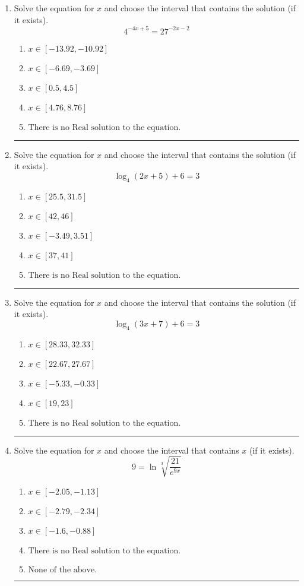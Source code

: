 \documentclass[14pt]{extbook}
\newcommand{\litem}[1]{\item#1\hspace*{-1cm}\rule{\textwidth}{0.4pt}}
\begin{document}
\begin{enumerate}
{\begin{enumerate}[label=\Alph*.]
\end{enumerate} }
\litem{
Solve the equation for $x$ and choose the interval that contains the solution (if it exists).\[ 4^{-4x+5} = 27^{-2x-2} \]\begin{enumerate}[label=\Alph*.]
\item \( x \in [-13.92, -10.92] \)
\item \( x \in [-6.69, -3.69] \)
\item \( x \in [0.5, 4.5] \)
\item \( x \in [4.76, 8.76] \)
\item \( \text{There is no Real solution to the equation.} \)

\end{enumerate} }
\litem{
Solve the equation for $x$ and choose the interval that contains the solution (if it exists).\[ \log_{4}{(2x+5)}+6 = 3 \]\begin{enumerate}[label=\Alph*.]
\item \( x \in [25.5, 31.5] \)
\item \( x \in [42, 46] \)
\item \( x \in [-3.49, 3.51] \)
\item \( x \in [37, 41] \)
\item \( \text{There is no Real solution to the equation.} \)

\end{enumerate} }
\litem{
Solve the equation for $x$ and choose the interval that contains the solution (if it exists).\[ \log_{4}{(3x+7)}+6 = 3 \]\begin{enumerate}[label=\Alph*.]
\item \( x \in [28.33, 32.33] \)
\item \( x \in [22.67, 27.67] \)
\item \( x \in [-5.33, -0.33] \)
\item \( x \in [19, 23] \)
\item \( \text{There is no Real solution to the equation.} \)

\end{enumerate} }
\litem{
 Solve the equation for $x$ and choose the interval that contains $x$ (if it exists).\[  9 = \ln{\sqrt[3]{\frac{21}{e^{9x}}}} \]\begin{enumerate}[label=\Alph*.]
\item \( x \in [-2.05, -1.13] \)
\item \( x \in [-2.79, -2.34] \)
\item \( x \in [-1.6, -0.88] \)
\item \( \text{There is no Real solution to the equation.} \)
\item \( \text{None of the above.} \)


\end{enumerate}}
\end{enumerate}
\end{document}

